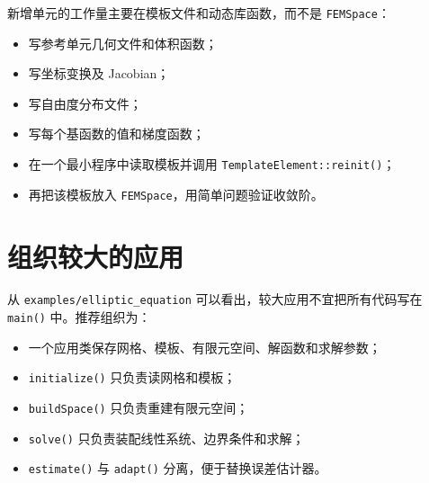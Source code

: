 \documentclass[UTF8,openany,zihao=-4,scheme=chinese]{ctexbook}
\newcommand{\file}[1]{\nolinkurl{#1}}
\newcommand{\class}[1]{\texttt{#1}}
\begin{document}
新增单元的工作量主要在模板文件和动态库函数，而不是 \class{FEMSpace}：

\begin{itemize}[leftmargin=2em]
  \item 写参考单元几何文件和体积函数；
  \item 写坐标变换及 Jacobian；
  \item 写自由度分布文件；
  \item 写每个基函数的值和梯度函数；
  \item 在一个最小程序中读取模板并调用 \class{TemplateElement::reinit()}；
  \item 再把该模板放入 \class{FEMSpace}，用简单问题验证收敛阶。
\end{itemize}

\section{组织较大的应用}

从 \file{examples/elliptic_equation} 可以看出，较大应用不宜把所有代码写在 \class{main()} 中。推荐组织为：

\begin{itemize}[leftmargin=2em]
  \item 一个应用类保存网格、模板、有限元空间、解函数和求解参数；
  \item \class{initialize()} 只负责读网格和模板；
  \item \class{buildSpace()} 只负责重建有限元空间；
  \item \class{solve()} 只负责装配线性系统、边界条件和求解；
  \item \class{estimate()} 与 \class{adapt()} 分离，便于替换误差估计器。
\end{itemize}

\backmatter



\end{document}
